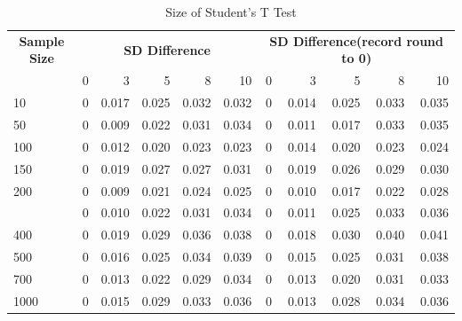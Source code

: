 \documentclass[]{article}
\begin{document}
\begin{table}

\caption{\label{tab:size-tables}Size of Student's T Test}
\centering
\begin{tabular}[t]{lrrrrrrrrrr}
\toprule
\multicolumn{1}{c}{\bfseries Sample Size} & \multicolumn{5}{c}{\bfseries SD Difference} & \multicolumn{5}{c}{\bfseries SD Difference(record round to 0)} \\
\cmidrule(l{2pt}r{2pt}){1-1} \cmidrule(l{2pt}r{2pt}){2-6} \cmidrule(l{2pt}r{2pt}){7-11}
  & 0 & 3 & 5 & 8 & 10 & 0 & 3 & 5 & 8 & 10\\
\midrule
10 & 0 & 0.017 & 0.025 & 0.032 & 0.032 & 0 & 0.014 & 0.025 & 0.033 & 0.035\\
50 & 0 & 0.009 & 0.022 & 0.031 & 0.034 & 0 & 0.011 & 0.017 & 0.033 & 0.035\\
100 & 0 & 0.012 & 0.020 & 0.023 & 0.023 & 0 & 0.014 & 0.020 & 0.023 & 0.024\\
150 & 0 & 0.019 & 0.027 & 0.027 & 0.031 & 0 & 0.019 & 0.026 & 0.029 & 0.030\\
200 & 0 & 0.009 & 0.021 & 0.024 & 0.025 & 0 & 0.010 & 0.017 & 0.022 & 0.028\\
\addlinespace
300 & 0 & 0.010 & 0.022 & 0.031 & 0.034 & 0 & 0.011 & 0.025 & 0.033 & 0.036\\
400 & 0 & 0.019 & 0.029 & 0.036 & 0.038 & 0 & 0.018 & 0.030 & 0.040 & 0.041\\
500 & 0 & 0.016 & 0.025 & 0.034 & 0.039 & 0 & 0.015 & 0.025 & 0.031 & 0.038\\
700 & 0 & 0.013 & 0.022 & 0.029 & 0.034 & 0 & 0.013 & 0.020 & 0.031 & 0.033\\
1000 & 0 & 0.015 & 0.029 & 0.033 & 0.036 & 0 & 0.013 & 0.028 & 0.034 & 0.036\\
\bottomrule
\end{tabular}
\end{table}
\end{document}
